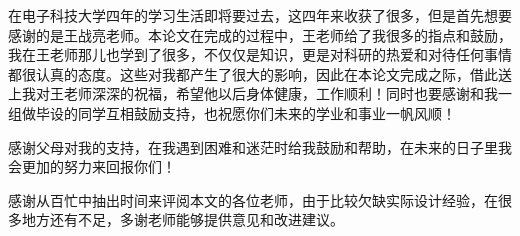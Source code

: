 
在电子科技大学四年的学习生活即将要过去，这四年来收获了很多，但是首先想要感谢的是王战亮老师。本论文在完成的过程中，王老师给了我很多的指点和鼓励，我在王老师那儿也学到了很多，不仅仅是知识，更是对科研的热爱和对待任何事情都很认真的态度。这些对我都产生了很大的影响，因此在本论文完成之际，借此送上我对王老师深深的祝福，希望他以后身体健康，工作顺利！同时也要感谢和我一组做毕设的同学互相鼓励支持，也祝愿你们未来的学业和事业一帆风顺！

感谢父母对我的支持，在我遇到困难和迷茫时给我鼓励和帮助，在未来的日子里我会更加的努力来回报你们！

感谢从百忙中抽出时间来评阅本文的各位老师，由于比较欠缺实际设计经验，在很多地方还有不足，多谢老师能够提供意见和改进建议。